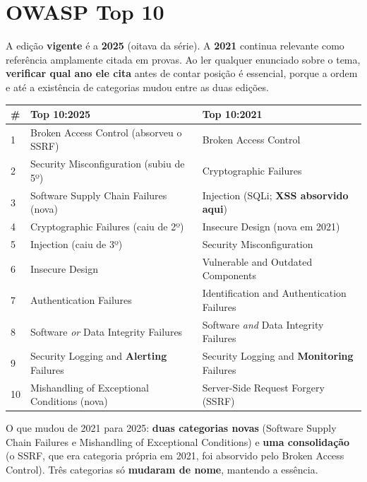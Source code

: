 \section{OWASP Top 10}

\begin{conceito}
A edição \textbf{vigente} é a \textbf{2025} (oitava da série). A
\textbf{2021} continua relevante como referência amplamente citada em
provas. Ao ler qualquer enunciado sobre o tema, \textbf{verificar qual ano
ele cita} antes de contar posição é essencial, porque a ordem e até a
existência de categorias mudou entre as duas edições.

\begin{center}
\begin{tabular}{@{}p{1.3cm}p{5.3cm}p{5.3cm}@{}}
\toprule
\# & \textbf{Top 10:2025} & \textbf{Top 10:2021} \\
\midrule
1 & Broken Access Control (absorveu o SSRF) & Broken Access Control \\
2 & Security Misconfiguration (subiu de 5º) & Cryptographic Failures \\
3 & Software Supply Chain Failures (nova) & Injection (SQLi; \textbf{XSS
absorvido aqui}) \\
4 & Cryptographic Failures (caiu de 2º) & Insecure Design (nova em 2021) \\
5 & Injection (caiu de 3º) & Security Misconfiguration \\
6 & Insecure Design & Vulnerable and Outdated Components \\
7 & Authentication Failures & Identification and Authentication Failures \\
8 & Software \textit{or} Data Integrity Failures & Software \textit{and}
Data Integrity Failures \\
9 & Security Logging and \textbf{Alerting} Failures & Security Logging
and \textbf{Monitoring} Failures \\
10 & Mishandling of Exceptional Conditions (nova) & Server-Side Request
Forgery (SSRF) \\
\bottomrule
\end{tabular}
\end{center}

O que mudou de 2021 para 2025: \textbf{duas categorias novas} (Software
Supply Chain Failures e Mishandling of Exceptional Conditions) e
\textbf{uma consolidação} (o SSRF, que era categoria própria em 2021, foi
absorvido pelo Broken Access Control). Três categorias só \textbf{mudaram
de nome}, mantendo a essência.
\end{conceito}


